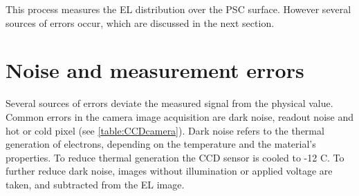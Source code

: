 This process measures the EL distribution over the PSC surface. However several sources of errors occur, which are discussed in the next section.
\FloatBarrier
\section{Noise and measurement errors}
Several sources of errors deviate the measured signal from the physical value. Common errors in the camera image acquisition are dark noise, readout noise and hot or cold pixel (see \autoref{table:CCDcamera}). Dark noise refers to the thermal generation of electrons, depending on the temperature and the material's properties. To reduce thermal generation the CCD sensor is cooled to -12 \textdegree C. To further reduce dark noise, images without illumination or applied voltage are taken, and subtracted from the EL image.\\

